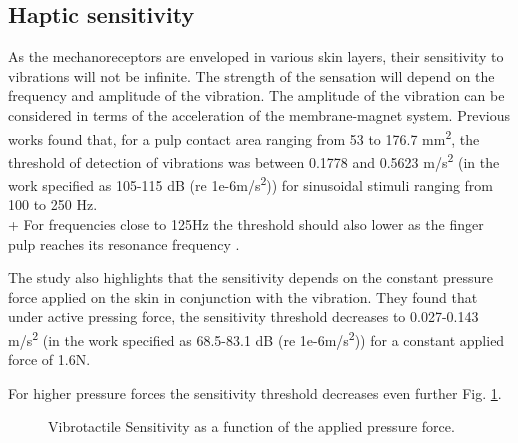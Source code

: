 \subsection{Haptic sensitivity}
\label{Haptic sensitivity}

As the mechanoreceptors are enveloped in various skin layers, their sensitivity to vibrations will not be infinite. The strength of the sensation will depend on the frequency and amplitude of the vibration. The amplitude of the vibration can be considered in terms of the acceleration of the membrane-magnet system.
Previous works \cite{Vibrotactile_Sensitivity} found that, for a pulp contact area ranging from 53 to 176.7 mm\textsuperscript{2}, the threshold of detection of vibrations was between 0.1778 and 0.5623 m/s\textsuperscript{2} (in the work specified as 105-115 dB (re 1e-6m/s\textsuperscript{2})) for sinusoidal stimuli ranging from 100 to 250 Hz. \\+
For frequencies close to 125Hz the threshold should also lower as the finger pulp reaches its resonance frequency \cite{Skin_freqs_penetration}.

The study also highlights that the sensitivity depends on the constant pressure force applied on the skin in conjunction with the vibration.
They found that under active pressing force, the sensitivity threshold decreases to 0.027-0.143 m/s\textsuperscript{2} (in the work specified as 68.5-83.1 dB (re 1e-6m/s\textsuperscript{2})) for a constant applied force of 1.6N.

For higher pressure forces the sensitivity threshold decreases even further Fig.
\ref{fig:Vibrotactile_Sensitivity}.
\begin{figure}[H]
    \centering
    \caption{Vibrotactile Sensitivity as a function of the applied pressure force.}
    \label{fig:Vibrotactile_Sensitivity}
\end{figure}
